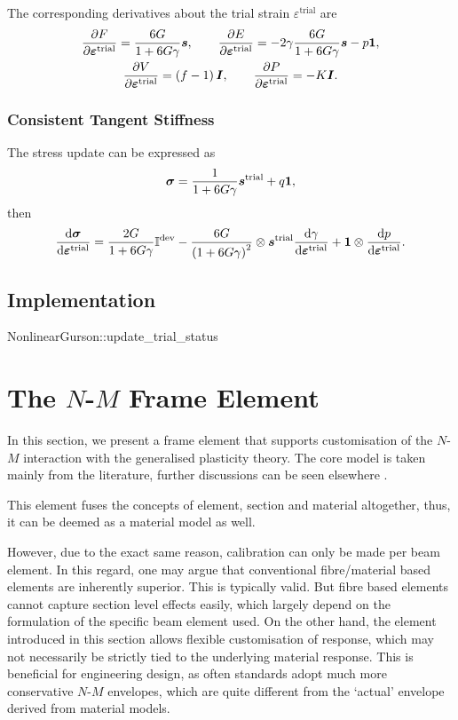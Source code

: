 The corresponding derivatives about the trial strain $\varepsilon^\text{trial}$ are
\begin{gather}
\dfrac{\partial{F}}{\partial{\bm{\varepsilon}^\text{trial}}}=\dfrac{6G}{1+6G\gamma}\bm{s},\qquad
\dfrac{\partial{E}}{\partial{\bm{\varepsilon}^\text{trial}}}=-2\gamma\dfrac{6G}{1+6G\gamma}\bm{s}-p\bm{1},\\
\dfrac{\partial{V}}{\partial{\bm{\varepsilon}^\text{trial}}}=\left(f-1\right)\bm{I},\qquad
\dfrac{\partial{P}}{\partial{\bm{\varepsilon}^\text{trial}}}=-K\bm{I}.
\end{gather}
\subsubsection{Consistent Tangent Stiffness}
The stress update can be expressed as
\begin{gather}
\bm{\sigma}=\dfrac{1}{1+6G\gamma}\bm{s}^\text{trial}+q\bm{1},
\end{gather}
then
\begin{gather}
\dfrac{\mathrm{d}\bm{\sigma}}{\mathrm{d}\bm{\varepsilon}^\text{trial}}=\dfrac{2G}{1+6G\gamma}\mathbb{I}^\text{dev}-\dfrac{6G}{\left(1+6G\gamma\right)^2}\otimes\bm{s}^\text{trial}\dfrac{\mathrm{d}\gamma}{\mathrm{d}\bm{\varepsilon}^\text{trial}}+\bm{1}\otimes\dfrac{\mathrm{d}p}{\mathrm{d}\bm{\varepsilon}^\text{trial}}.
\end{gather}
\subsection{Implementation}
\begin{cppcode}
NonlinearGurson::update_trial_status
\end{cppcode}
\section{The \texorpdfstring{$N$-$M$}{N-M} Frame Element}
In this section, we present a frame element that supports customisation of the $N$-$M$ interaction with the generalised plasticity theory. The core model is taken mainly from the literature, further discussions can be seen elsewhere \cite{Chang2023}.

This element fuses the concepts of element, section and material altogether, thus, it can be deemed as a material model as well.

However, due to the exact same reason, calibration can only be made per beam element.
In this regard, one may argue that conventional fibre/material based elements are inherently superior.
This is typically valid.
But fibre based elements cannot capture section level effects easily, which largely depend on the formulation of the specific beam element used.
On the other hand, the element introduced in this section allows flexible customisation of response, which may not necessarily be strictly tied to the underlying material response.
This is beneficial for engineering design, as often standards adopt much more conservative $N$-$M$ envelopes, which are quite different from the `actual' envelope derived from material models.
